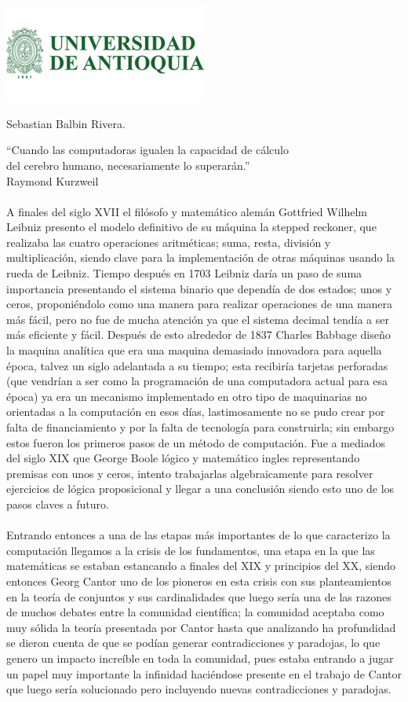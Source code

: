 \documentclass{letter}
\begin{document}
\includegraphics[width=0.5\textwidth]{logo-udea.png}\\

\opening{Sebastian Balbin Rivera.}
“Cuando las computadoras igualen la capacidad de cálculo\\
del cerebro humano, necesariamente lo superarán.” \\
Raymond Kurzweil\\\\
A finales del siglo XVII el filósofo y matemático alemán Gottfried Wilhelm Leibniz presento el modelo definitivo de su máquina la stepped reckoner, que realizaba las cuatro operaciones aritméticas; suma, resta, división y multiplicación, siendo clave para la implementación de otras máquinas usando la rueda de Leibniz. Tiempo después en 1703 Leibniz daría un paso de suma importancia presentando el sistema binario que dependía de dos estados; unos y ceros, proponiéndolo como una manera para realizar operaciones de una manera más fácil, pero no fue de mucha atención ya que el sistema decimal tendía a ser más eficiente y fácil. Después de esto alrededor de 1837 Charles Babbage diseño la maquina analítica que era una maquina demasiado innovadora para aquella época, talvez un siglo adelantada a su tiempo; esta recibiría tarjetas perforadas  (que vendrían a ser como la programación de una computadora actual para esa época) ya era un mecanismo implementado en otro tipo de maquinarias no orientadas a la computación en esos días, lastimosamente no se pudo crear por falta de financiamiento y por la falta de tecnología para construirla; sin embargo estos fueron los primeros pasos de un método de computación. Fue a mediados del siglo XIX que George Boole lógico y matemático ingles representando premisas con unos y ceros, intento trabajarlas algebraicamente para resolver ejercicios de lógica proposicional y llegar a una conclusión siendo esto uno de los pasos claves a futuro. \\\\ 
Entrando entonces a una de las etapas más importantes de lo que caracterizo la computación llegamos a la crisis de los fundamentos, una etapa en la que las matemáticas se estaban estancando a finales del XIX y principios del XX, siendo entonces Georg Cantor uno de los pioneros en esta crisis con sus planteamientos en la teoría de conjuntos y sus cardinalidades que luego sería una de las razones de muchos debates entre la comunidad científica; la comunidad aceptaba como muy sólida la teoría presentada por Cantor hasta que analizando ha profundidad se dieron cuenta de que se podían generar contradicciones y paradojas, lo que genero un impacto increíble en toda la comunidad, pues estaba entrando a jugar un papel muy importante la infinidad haciéndose presente en el trabajo de Cantor que luego sería solucionado pero incluyendo nuevas contradicciones y paradojas.\\\\
\end{document}
